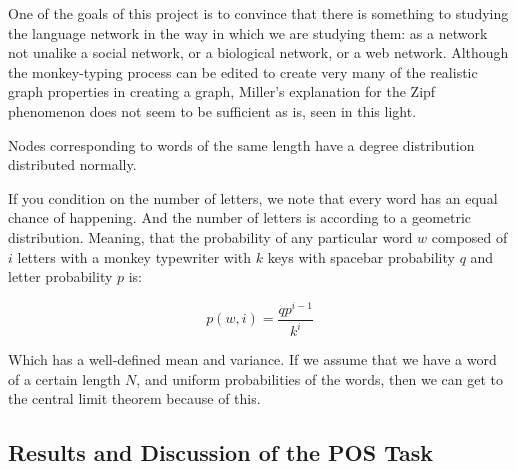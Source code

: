 \documentclass[12pt]{article}
\begin{document}
One of the goals of this project is to convince that there is something to studying the language network in the way in which we are studying them: as a network not unalike a social network, or a biological network, or a web network. Although the monkey-typing process can be edited to create very many of the realistic graph properties in creating a graph, Miller's explanation for the Zipf phenomenon does not seem to be sufficient as is, seen in this light. %


Nodes corresponding to words of the same length have a degree distribution distributed normally. %

If you condition on the number of letters, we note that every word has an equal chance of happening. And the number of letters is according to a geometric distribution. Meaning, that the probability of any particular word $w$ composed of $i$ letters with a monkey typewriter with $k$ keys with spacebar probability $q$ and letter probability $p$ is:

$$p(w, i) = \frac{qp^{i-1}}{k^i}$$

Which has a well-defined mean and variance. If we assume that we have a word of a certain length $N$, and uniform probabilities of the words, then we can get to the central limit theorem because of this. %




\subsection{Results and Discussion of the POS Task}

\end{document}
